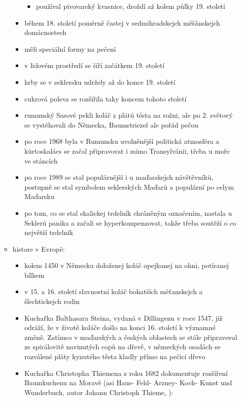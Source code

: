 \begin{itemize}
\begin{itemize}
\begin{itemize}
      \begin{itemize}
      \tightlist
      \item
        používal pivovarský kvasnice, droždí až kolem půlky 19. století
      \end{itemize}
    \item
      během 18. století poměrně častej v sedmihradskejch měšǎnskejch
      domácnostech
    \item
      měli speciální formy na pečení
    \item
      v lidovém prostředí se šíří začátkem 19. století
    \item
      krby se v seklersku udržely až do konce 19. století
    \item
      cukrová poleva se rozšířila taky koncem tohoto století
    \item
      rumunský Sasové pekli koláč z plátů těsta na rožni, ale po 2.
      světový se vystěhovali do Německa, Baumstriezel ale pořád pečou
    \item
      po roce 1968 byla v Rumunsku uvolněnější politická atmosféra a
      kürtoskalács se začal připravovat i mimo Transylvánii, třeba u
      moře ve stáncích
    \item
      po roce 1989 se stal populárnější i u maďarskejch návštěvníků,
      postupně se stal symbolem seklerských Maďarů a populární po celym
      Maďarsku
    \item
      po tom, co se stal skalickej trdelník chráněným označením, nastala
      u Seklerů panika a začali se hyperkompenzovat, takže třeba soutěží
      o co největší trdelník
    \end{itemize}
  \item
    histore v Evropě:

    \begin{itemize}
    \tightlist
    \item
      kolem 1450 v Německu doloženej koláč opejkanej na ohni, potíranej
      bílkem
    \item
      v 15. a 16. století slavnostní koláč bohatších měťanskejch a
      šlechtickejch rodin
    \item
      Kuchařka Balthasara Steina, vydaná v Dillingenu v roce 1547, již
      odráží, že v životě koláče došlo na konci 16. století k významné
      změně. Zatímco v maďarských a českých oblastech se stále
      připravoval ze spirálovitě navinutých copů na dřevě, v německých
      osadách se rozválené pláty kynutého těsta kladly přímo na pečicí
      dřevo
    \item
      Kuchařka Christopha Thiemena z roku 1682 dokumentuje rozšíření
      Baumkuchenu na Moravě (asi Haus- Feld- Arzney- Koch- Kunst und
      Wunderbuch, autor Johann Christoph Thieme, ):


\end{itemize}
\end{itemize}
\end{itemize}
